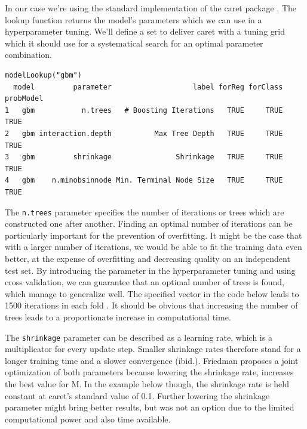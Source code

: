 \documentclass[12pt,a4paper]{article}
\begin{document}
In our case we're using the standard implementation of the caret package \cite{pack::caret}. The lookup function returns the model's parameters which we can use in a hyperparameter tuning. We'll define a set to deliver caret with a tuning grid which it should use for a systematical search for an optimal parameter combination. 
\begin{Verbatim}[fontsize=\small]
    modelLookup("gbm")
  model         parameter                   label forReg forClass probModel
1   gbm           n.trees   # Boosting Iterations   TRUE     TRUE      TRUE
2   gbm interaction.depth          Max Tree Depth   TRUE     TRUE      TRUE
3   gbm         shrinkage               Shrinkage   TRUE     TRUE      TRUE
4   gbm    n.minobsinnode Min. Terminal Node Size   TRUE     TRUE      TRUE
\end{Verbatim}
The \verb+n.trees+ parameter specifies the number of iterations or trees which are constructed one after another. Finding an optimal number of iterations can be particularly important for the prevention of overfitting. It might be the case that with a larger number of iterations, we would be able to fit the training data even better, at the expense of overfitting and decreasing quality on an independent test set. By introducing the parameter in the hyperparameter tuning and using cross validation, we can guarantee that an optimal number of trees is found, which manage to generalize well. The specified vector in the code below leads to 1500 iterations in each fold \cite{friedman2001greedy}. It should be obvious that increasing the number of trees leads to a proportionate increase in computational time.

The \verb+shrinkage+ parameter can be described as a learning rate, which is a multiplicator for every update step. Smaller shrinkage rates therefore stand for a longer training time and a slower convergence (ibid.). Friedman proposes a joint optimization of both parameters because lowering the shrinkage rate, increases the best value for M. In the example below though, the shrinkage rate is held constant at caret's standard value of 0.1. Further lowering the shrinkage parameter might bring better results, but was not an option due to the limited computational power and also time available.
\end{document}
